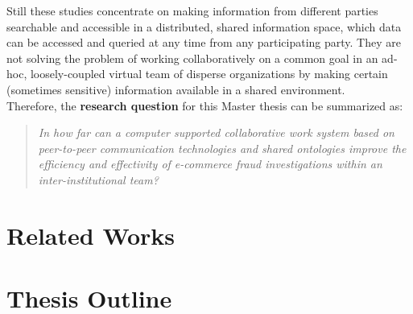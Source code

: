 Still these studies concentrate on making information from different parties searchable and accessible in a distributed, shared information space, which data can be accessed and queried at any time from any participating party.
They are not solving the problem of working collaboratively on a common goal in an ad-hoc, loosely-coupled virtual team of disperse organizations by making certain (sometimes sensitive) information available in a shared environment. \\

Therefore, the \textbf{research question} for this Master thesis can be summarized as:
\begin{quotation}
  \textit{In how far can a computer supported collaborative work system based on peer-to-peer communication technologies and shared ontologies improve the efficiency and effectivity of e-commerce fraud investigations within an inter-institutional team?}
\end{quotation}


\section{Related Works}
\label{sec:related_works}


\section{Thesis Outline}
\label{sec:thesis_outline}


